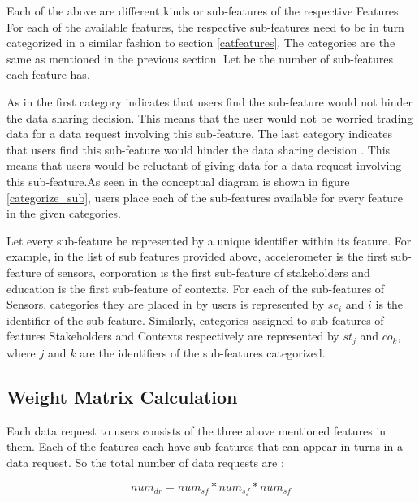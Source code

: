 Each of the above are different kinds or sub-features of the respective Features. 
For each of the available features, the respective sub-features need to be in turn categorized in a similar fashion to section \ref{catfeatures}.
The categories are the same as mentioned in the previous section. Let \numsubfeatures be the number of sub-features each feature has.


As in the first category indicates that users find the sub-feature would not hinder the data sharing decision. This means that the user would not be worried trading data for a data request involving this sub-feature. The last category indicates that users find this sub-feature would hinder the data sharing decision . This means that users would be reluctant of giving data for a data request involving this sub-feature.As seen in the conceptual diagram is shown in figure \ref{categorize_sub}, users place each of the sub-features available for every feature in the given categories.

Let every sub-feature be represented by a unique identifier within its feature. For example, in the list of sub features provided above, accelerometer is the first sub-feature of sensors, corporation is the first sub-feature of stakeholders and education is the first sub-feature of contexts. For each of the sub-features of Sensors, categories they are placed in by users is represented by $se_{i}$ and $i$ is the identifier
of the sub-feature. Similarly, categories assigned to sub features of features Stakeholders and Contexts respectively are represented by $st_{j}$ and $co_{k}$, where $j$ and $k$ are the identifiers of the sub-features categorized.

\subsection{Weight Matrix Calculation}
Each data request to users consists of the three above mentioned features in them. Each of the features each have \numsubfeatures sub-features that can appear in turns in a data request. So the total number of data requests are :

\begin{equation}
num_{dr} =  num_{sf} * num_{sf} * num_{sf}   
\end{equation}

